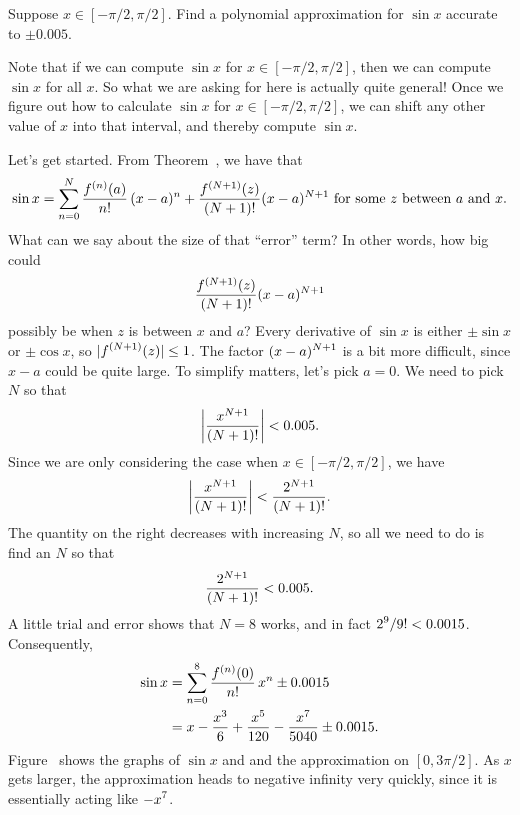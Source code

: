 \begin{example}\label{example:approximate-sin}
Suppose $x \in [-\pi/2,\pi/2]$.  Find a polynomial approximation for $\sin x$ accurate to $\pm
0.005$. 
\end{example}
\begin{solution}
  Note that if we can compute $\sin x$ for $x\in[-\pi/2,\pi/2]$, then
  we can compute $\sin x$ for all $x$.  So what we are asking for here
  is actually quite general!  Once we figure out how to calculate
  $\sin x$ for $x \in [-\pi/2,\pi/2]$, we can shift any other value of
  $x$ into that interval, and thereby compute $\sin x$.

  Let's get started.  From Theorem~, we
  have that
  \[
  \sin x= \sum_{n=0}^N{f^{(n)}(a)\over n!}\,(x-a)^n + {f^{(N+1)}(z)\over
    (N+1)!}(x-a)^{N+1} \mbox{ for some $z$ between $a$ and $x$.}
  \]
  What can we say about the size of that ``error'' term?  In other words, how big could
  $${f^{(N+1)}(z)\over (N+1)!}(x-a)^{N+1}$$
  possibly be when $z$ is between $x$ and $a$?  Every derivative of
  $\sin x$ is either $\pm\sin x$ or $\pm\cos x$, so $\displaystyle
  |f^{(N+1)}(z)| \leq 1$. The factor $\displaystyle (x-a)^{N+1}$ is a bit more
  difficult, since $x-a$ could be quite large. To simplify matters,
  let's pick $a=0$.  We need to pick $N$ so that 
  \[
  \left|{x^{N+1}\over (N+1)!}\right|< 0.005.
  \]
  Since we are only considering the case when $x \in [-\pi/2,\pi/2]$, we have
  \[
  \left|{x^{N+1}\over (N+1)!}\right|<{2^{N+1}\over (N+1)!}.
  \]
  The quantity on the right decreases with increasing $N$, so all we
  need to do is find an $N$ so that 
  $${2^{N+1}\over (N+1)!}<0.005.$$
  A little trial and error shows that $N=8$ works, 
  and in fact $\displaystyle 2^{9}/9!<0.0015$.  Consequently,
  \begin{align*}
    \sin x &=\sum_{n=0}^8{f^{(n)}(0)\over n!}\,x^n \pm 0.0015 \\
    &=x-{x^3\over 6}+{x^5\over 120}-{x^7\over 5040}\pm 0.0015. \\
  \end{align*}
  Figure~ shows the graphs of $\sin x$ and
  and the approximation on $[0,3\pi/2]$. As $x$ gets larger, the
  approximation heads to negative infinity very quickly, since it is
  essentially acting like $\displaystyle -x^7$.
\end{solution}

